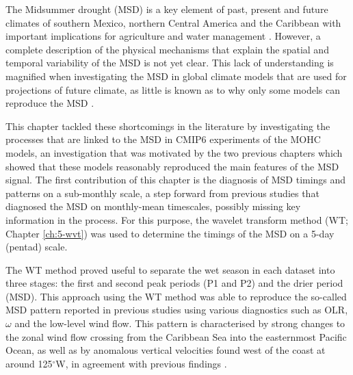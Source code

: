The Midsummer drought (MSD) is a key element of past, present and future climates of southern Mexico, northern Central America and the Caribbean with important implications for agriculture and water management \citep{hellin2017,de2018,harvey2018}. However, a complete description of the physical mechanisms that explain the spatial and temporal variability of the MSD is not yet clear. This lack of understanding is magnified when investigating the MSD in global climate models that are used for projections of future climate, as little is known as to why only some models can reproduce the MSD \citep{ryu2014}.


This chapter tackled these shortcomings in the literature by investigating the processes that are linked to the MSD in CMIP6 experiments of the MOHC models, an investigation that was motivated by the two previous chapters which showed that these models reasonably reproduced the main features of the MSD signal.
The first contribution of this chapter is the diagnosis of MSD timings and patterns on a sub-monthly scale, a step forward from previous studies that diagnosed the MSD on monthly-mean timescales, possibly missing key information in the process. 
For this purpose, the wavelet transform method (WT; Chapter \ref{ch:5-wvt}) was used to determine the timings of the MSD on a 5-day (pentad) scale. 


The WT method proved useful to separate the wet season in each dataset into three stages: the first and second peak periods (P1 and P2) and the drier period (MSD). 
This approach using the WT method was able to reproduce the so-called MSD pattern reported in previous studies \citep{zermeno2019,zhao2020} using various diagnostics such as OLR, $\omega$ and the low-level wind flow. This pattern is characterised by strong changes to the zonal wind flow crossing from the Caribbean Sea into the easternmost Pacific Ocean, as well as by anomalous vertical velocities found west of the coast at around 125$^\circ$W, in agreement with previous findings \citep{herrera2015,zermeno2019}. 

